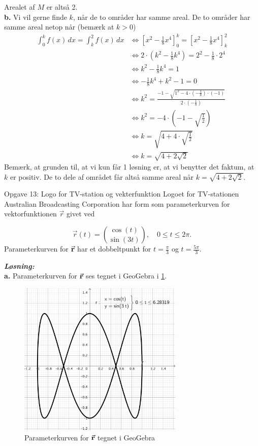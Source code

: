 \documentclass{article}
\newcommand{\sol}{\setlength{\parindent}{0cm}\textbf{\textit{Løsning:}}\setlength{\parindent}{1cm}}
\begin{document}
Arealet af $M$ er altså 2.\\[1ex]
\textbf{b.}
Vi vil gerne finde $k$, når de to områder har samme areal. 
De to områder har samme areal netop når (bemærk at $k>0$)
\begin{equation*}
\begin{split}
  \int_{0}^{k} f(x) \,dx = \int_{k}^{2} f(x) \,dx &\iff \left[x^2-\frac{1}{8}x^4\right]_0^k=\left[x^2-\frac{1}{8}x^4\right]_k^2\\
  &\iff 2 \cdot \left(k^2-\frac{1}{8}k^4\right) =2^2-\frac{1}{8}\cdot 2^4\\
  &\iff k^2-\frac{1}{8}k^4=1\\
  &\iff -\frac{1}{8}k^4+k^2-1=0\\
  &\iff k^2=\frac{-1 - \sqrt{1^2-4 \cdot \left(-\frac{1}{8} \right) \cdot \left(-1\right) } }{2 \cdot \left(-\frac{1}{8}\right) }\\
  &\iff k^2=-4 \cdot \left(-1 - \sqrt{\frac{1}{2}} \right) \\
  &\iff k=\sqrt{4+4 \cdot \sqrt{\frac{1}{2}} } \\
  &\iff k=\sqrt{4+2 \sqrt{2} }
\end{split}
\end{equation*}
Bemærk, at grunden til, at vi kun får 1 løsning er, at vi benytter det faktum, at $k$ er positiv.
De to dele af området får altså samme areal når $k=\sqrt{4+2 \sqrt{2} } $.
\begin{question}{Opgave 13: Logo for TV-station og vekterfunktion}{}
  Logoet for TV-stationen Australian Broadcasting Corporation har form som
parameterkurven for vektorfunktionen $\vec{r}$ givet ved

$$\vec{r}\left(t\right)=\binom{\cos(t)}{\sin(3t)},\quad0\leq t\leq2\pi.$$
  Parameterkurven for $\va{r} $ har et dobbeltpunkt for $t=\frac{\pi }{3}$ og $t=\frac{5 \pi }{3}$. 
\end{question}
\sol \\
\textbf{a.}
Parameterkurven for $\va{r} $ ses tegnet i GeoGebra i \cref{fig:param}.
\begin{figure}[H]
\begin{center}
  \includegraphics[width=0.7\textwidth]{parameter.png}
\end{center}
\caption{Parameterkurven for $\va{r} $ tegnet i GeoGebra }
\label{fig:param}
\end{figure}
\end{document}
